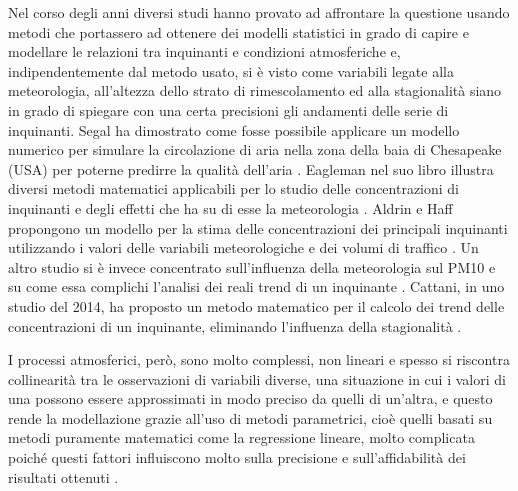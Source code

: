 Nel corso degli anni diversi studi hanno provato ad affrontare la questione usando metodi che portassero ad ottenere dei modelli statistici in grado di capire e modellare le relazioni tra inquinanti e condizioni atmosferiche e, indipendentemente dal metodo usato, si è visto come variabili legate alla meteorologia, all'altezza dello strato di rimescolamento ed alla stagionalità siano in grado di spiegare con una certa precisioni gli andamenti delle serie di inquinanti.  
Segal ha dimostrato come fosse possibile applicare un modello numerico per simulare la circolazione di aria nella zona della baia di Chesapeake (USA) per poterne predirre la qualità dell'aria \cite{segal1982numerical}. Eagleman nel suo libro illustra diversi metodi matematici applicabili per lo studio delle concentrazioni di inquinanti e degli effetti che ha su di esse la meteorologia \cite{eagleman1991air}. Aldrin e Haff propongono un modello per la stima delle concentrazioni dei principali inquinanti utilizzando i valori delle variabili meteorologiche e dei volumi di traffico \cite{aldrin2005generalised}. Un altro studio si è invece concentrato sull'influenza della meteorologia sul PM10 e su come essa complichi l'analisi dei reali trend di un inquinante \cite{barmpadimos2011influence}. Cattani, in uno studio del 2014, ha proposto un metodo matematico per il calcolo dei trend delle concentrazioni di un inquinante, eliminando l'influenza della stagionalità \cite{cattani2014analisi}.

I processi atmosferici, però, sono molto complessi, non lineari e spesso si riscontra collinearità tra le osservazioni di variabili diverse, una situazione in cui i valori di una possono essere approssimati in modo preciso da quelli di un'altra, e questo rende la modellazione grazie all'uso di metodi parametrici, cioè quelli basati su metodi puramente matematici come la regressione lineare, molto complicata poiché questi fattori influiscono molto sulla precisione e sull'affidabilità dei risultati ottenuti \cite{gunst1975regression}. 

